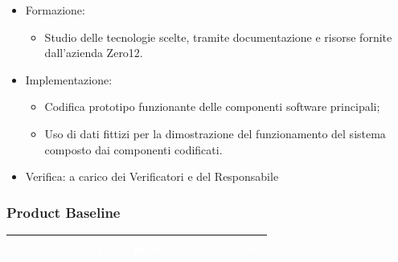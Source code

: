 {{\begin{itemize}
            \begin{itemize}
                \item Formazione: 
                    \begin{itemize}
                        \item Studio delle tecnologie scelte, tramite documentazione e risorse fornite dall'azienda Zero12.
                    \end{itemize}
                \item Implementazione: 
                    \begin{itemize}
                        \item Codifica prototipo funzionante delle componenti software principali;
                        \item Uso di dati fittizi per la dimostrazione del funzionamento del sistema composto dai componenti codificati.
                    \end{itemize}
                \item Verifica: a carico dei Verificatori e del Responsabile
            \end{itemize}
    \end{itemize}
    
    \subsubsection{Product Baseline} {
        \setlength{\freewidth}{\dimexpr\textwidth-30\tabcolsep}
        \renewcommand{\arraystretch}{1.0}
        \setlength{\aboverulesep}{0pt}
        \setlength{\belowrulesep}{0pt}
        \begin{longtable}{C{.4\freewidth} C{.4\freewidth}}
        \toprule
        \textcolor{white}{\textbf{Data inizio}}&
        \textcolor{white}{\textbf{Data previsione revisione}} \\
        \toprule
        \endhead
            

\end{longtable}}}}
